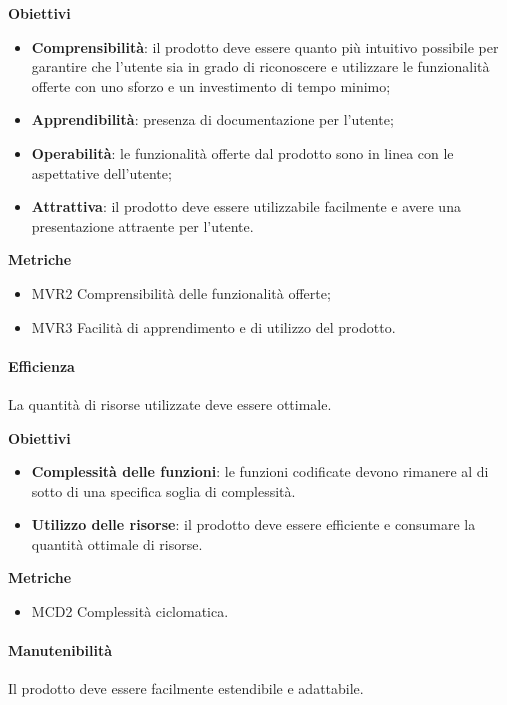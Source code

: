 \textbf{Obiettivi}
\begin{itemize}
\item \textbf{Comprensibilità}: il prodotto deve essere quanto più intuitivo possibile per garantire che l'utente sia in grado di riconoscere e utilizzare le funzionalità offerte con uno sforzo e un investimento di tempo minimo;
\item \textbf{Apprendibilità}: presenza di documentazione per l'utente;
\item \textbf{Operabilità}: le funzionalità offerte dal prodotto sono in linea con le aspettative dell'utente;
\item \textbf{Attrattiva}: il prodotto deve essere utilizzabile facilmente e avere una presentazione attraente per l'utente.
\end{itemize}

\textbf{Metriche}
\begin{itemize}
\item MVR2 Comprensibilità delle funzionalità offerte;
\item MVR3 Facilità di apprendimento e di utilizzo del prodotto.
\end{itemize}


\paragraph{Efficienza}

La quantità di risorse utilizzate deve essere ottimale.

\textbf{Obiettivi}
\begin{itemize}
\item \textbf{Complessità delle funzioni}: le funzioni codificate devono rimanere al di sotto di una specifica soglia di complessità.
\item \textbf{Utilizzo delle risorse}: il prodotto deve essere efficiente e consumare la quantità ottimale di risorse.
\end{itemize}

\textbf{Metriche}
\begin{itemize}
\item MCD2 Complessità ciclomatica.
\end{itemize}

\paragraph{Manutenibilità}

Il prodotto deve essere facilmente estendibile e adattabile.

